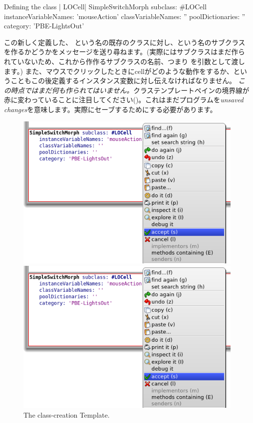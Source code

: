 \documentclass[a4paper,10pt,twoside]{book}
\begin{document}
\begin{classdef}[firstClassDef]{Defining the class \ct| LOCell|}
SimpleSwitchMorph subclass: #LOCell
   instanceVariableNames: 'mouseAction'
   classVariableNames: ''
   poolDictionaries: ''
   category: 'PBE-LightsOut'
\end{classdef}

この新しく定義した、 という名の既存のクラスに対し、という名のサブクラスを作るかどうかをメッセージを送り尋ねます。(実際にはサブクラスはまだ作られていないため、これから作作るサブクラスの名前、つまり を引数として渡します。)
また、マウスでクリックしたときにcellがどのような動作をするか、ということもこの後定義するインスタンス変数に対し伝えなければなりません。
\emph{この時点ではまだ何も作られてはいません。}クラステンプレートペインの境界線が赤に変わっていることに注目してください()。これはまだプログラムを\emph{unsaved changes}を意味します。実際にセーブするためにする必要があります。

\begin{figure}[h!t]
\ifluluelse
	{\centerline {\includegraphics[width=\textwidth]{AcceptClassDef}}}
	{\centerline {\includegraphics[scale=0.7]{AcceptClassDef}}}
\caption{The class-creation Template.
}
\end{figure}
\end{document}
